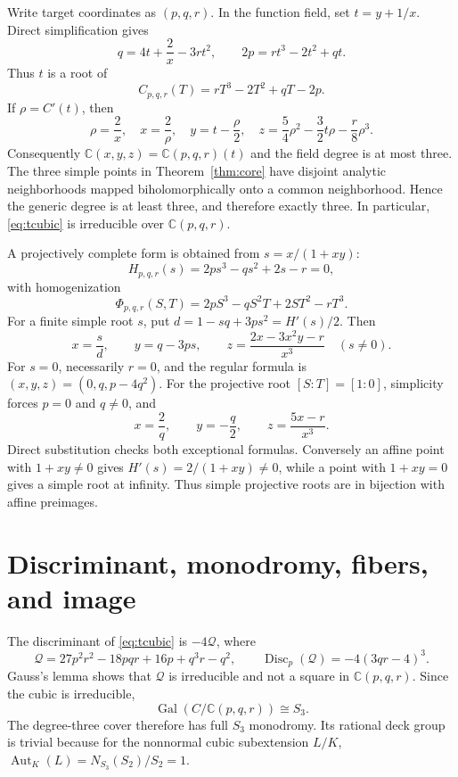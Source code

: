 \documentclass[11pt]{article}
\theoremstyle{remark}
\newcommand{\C}{\mathbb C}
\newcommand{\Gal}{\operatorname{Gal}}
\newcommand{\Disc}{\operatorname{Disc}}
\begin{document}
Write target coordinates as $(p,q,r)$. In the function field, set
$t=y+1/x$. Direct simplification gives
\[
q=4t+\frac2x-3rt^2,\qquad 2p=rt^3-2t^2+qt.
\]
Thus $t$ is a root of
\begin{equation}\label{eq:tcubic}
C_{p,q,r}(T)=rT^3-2T^2+qT-2p.
\end{equation}
If $\rho=C'(t)$, then
\begin{equation}\label{eq:trec}
\rho=\frac2x,\quad x=\frac2\rho,\quad y=t-\frac\rho2,
\quad z=\frac54\rho^2-\frac32t\rho-\frac r8\rho^3.
\end{equation}
Consequently $\C(x,y,z)=\C(p,q,r)(t)$ and the field degree is at most
three. The three simple points in Theorem~\ref{thm:core} have disjoint analytic
neighborhoods mapped biholomorphically onto a common neighborhood. Hence the
generic degree is at least three, and therefore exactly three. In particular,
\eqref{eq:tcubic} is irreducible over $\C(p,q,r)$.

A projectively complete form is obtained from $s=x/(1+xy)$:
\begin{equation}\label{eq:scubic}
H_{p,q,r}(s)=2ps^3-qs^2+2s-r=0,
\end{equation}
with homogenization
\[
\Phi_{p,q,r}(S,T)=2pS^3-qS^2T+2ST^2-rT^3.
\]
For a finite simple root $s$, put $d=1-sq+3ps^2=H'(s)/2$. Then
\[
x=\frac{s}{d},\qquad y=q-3ps,
\qquad z=\frac{2x-3x^2y-r}{x^3}\quad(s\neq0).
\]
For $s=0$, necessarily $r=0$, and the regular formula is
$(x,y,z)=(0,q,p-4q^2)$. For the projective root $[S:T]=[1:0]$,
simplicity forces $p=0$ and $q\neq0$, and
\[
x=\frac2q,\qquad y=-\frac q2,\qquad z=\frac{5x-r}{x^3}.
\]
Direct substitution checks both exceptional formulas. Conversely an affine
point with $1+xy\neq0$ gives $H'(s)=2/(1+xy)\neq0$, while a point with
$1+xy=0$ gives a simple root at infinity. Thus simple projective roots are
in bijection with affine preimages.

\section{Discriminant, monodromy, fibers, and image}

The discriminant of \eqref{eq:tcubic} is $-4\mathcal Q$, where
\[
\mathcal Q=27p^2r^2-18pqr+16p+q^3r-q^2,
\qquad
\Disc_p(\mathcal Q)=-4(3qr-4)^3.
\]
Gauss's lemma shows that $\mathcal Q$ is irreducible and not a square in
$\C(p,q,r)$. Since the cubic is irreducible,
\[
\Gal(C/\C(p,q,r))\cong S_3.
\]
The degree-three cover therefore has full $S_3$ monodromy. Its rational deck
group is trivial because for the nonnormal cubic subextension
$L/K$, $\operatorname{Aut}_K(L)=N_{S_3}(S_2)/S_2=1$.
\end{document}
